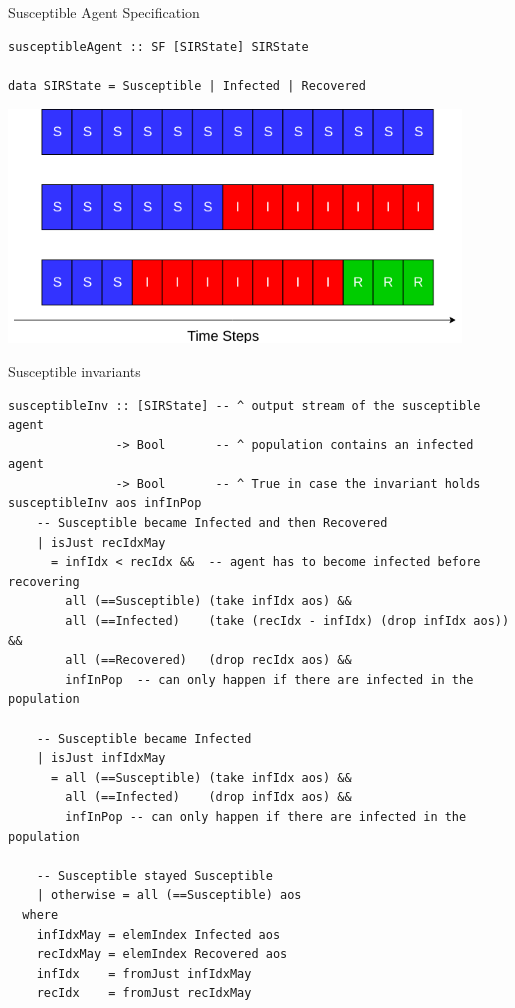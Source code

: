 \documentclass{beamer} %
\begin{document}
\begin{frame}[fragile]{Susceptible Agent Specification}
\begin{block}{}
\begin{verbatim}
susceptibleAgent :: SF [SIRState] SIRState

data SIRState = Susceptible | Infected | Recovered
\end{verbatim}
\end{block}

\begin{center}
\includegraphics[width=0.9\textwidth]{./fig/property_susceptible_output.png}
\end{center}
\end{frame}

\begin{frame}[fragile]{Susceptible invariants}
\begin{verbatim}
susceptibleInv :: [SIRState] -- ^ output stream of the susceptible agent 
               -> Bool       -- ^ population contains an infected agent
               -> Bool       -- ^ True in case the invariant holds
susceptibleInv aos infInPop
    -- Susceptible became Infected and then Recovered
    | isJust recIdxMay 
      = infIdx < recIdx &&  -- agent has to become infected before recovering
        all (==Susceptible) (take infIdx aos) && 
        all (==Infected)    (take (recIdx - infIdx) (drop infIdx aos)) && 
        all (==Recovered)   (drop recIdx aos) &&
        infInPop  -- can only happen if there are infected in the population

    -- Susceptible became Infected
    | isJust infIdxMay 
      = all (==Susceptible) (take infIdx aos) &&
        all (==Infected)    (drop infIdx aos) &&
        infInPop -- can only happen if there are infected in the population

    -- Susceptible stayed Susceptible
    | otherwise = all (==Susceptible) aos
  where
    infIdxMay = elemIndex Infected aos
    recIdxMay = elemIndex Recovered aos
    infIdx    = fromJust infIdxMay
    recIdx    = fromJust recIdxMay
\end{verbatim}
\end{frame}
\end{document}
